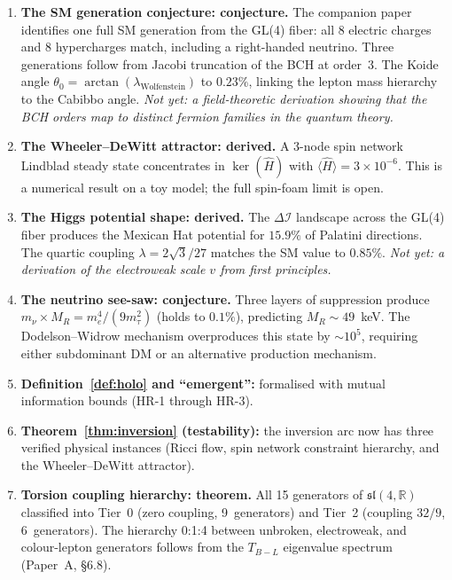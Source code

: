 \documentclass[11pt,a4paper]{article}
\theoremstyle{plain}
\theoremstyle{definition}
\theoremstyle{remark}
\newcommand{\DI}{\Delta\mathcal{I}}
\begin{document}
\begin{enumerate}[label=(\arabic*)]
  \item \textbf{The SM generation conjecture: conjecture.}
    The companion paper~\cite{Wallace2026a} identifies one full SM
    generation from the GL(4) fiber: all 8 electric charges and
    8 hypercharges match, including a right-handed neutrino.
    Three generations follow from Jacobi truncation of the BCH at order~3.
    The Koide angle $\theta_0 = \arctan(\lambda_{\mathrm{Wolfenstein}})$
    to $0.23\%$, linking the lepton mass hierarchy to the Cabibbo angle.
    \emph{Not yet: a field-theoretic derivation showing that the BCH
    orders map to distinct fermion families in the quantum theory.}

  \item \textbf{The Wheeler--DeWitt attractor: derived.}
    A 3-node spin network Lindblad steady state concentrates in
    $\ker(\hat{H})$ with $\langle\hat{H}\rangle = 3 \times 10^{-6}$.
    This is a numerical result on a toy model; the full spin-foam
    limit is open.

  \item \textbf{The Higgs potential shape: derived.}
    The $\DI$ landscape across the GL(4) fiber produces the Mexican Hat
    potential for $15.9\%$ of Palatini directions.  The quartic coupling
    $\lambda = 2\sqrt{3}/27$ matches the SM value to $0.85\%$.
    \emph{Not yet: a derivation of the electroweak scale $v$ from
    first principles.}

  \item \textbf{The neutrino see-saw: conjecture.}
    Three layers of suppression produce $m_\nu \times M_R = m_e^4/(9m_\tau^2)$
    (holds to $0.1\%$), predicting $M_R \sim 49$~keV.
    The Dodelson--Widrow mechanism overproduces this state by $\sim\!10^5$,
    requiring either subdominant DM or an alternative production mechanism.

  \item \textbf{Definition~\ref{def:holo} and ``emergent'':} formalised
    with mutual information bounds (HR-1 through HR-3).

  \item \textbf{Theorem~\ref{thm:inversion} (testability):} the inversion
    arc now has three verified physical instances (Ricci flow, spin network
    constraint hierarchy, and the Wheeler--DeWitt attractor).

  \item \textbf{Torsion coupling hierarchy: theorem.}
    All 15 generators of $\mathfrak{sl}(4,\mathbb{R})$ classified into
    Tier~0 (zero coupling, 9~generators) and Tier~2 (coupling $32/9$,
    6~generators).  The hierarchy 0:1:4 between unbroken, electroweak,
    and colour-lepton generators follows from the $T_{B{-}L}$ eigenvalue
    spectrum (Paper~A, \S 6.8).


\end{enumerate}
\end{document}
